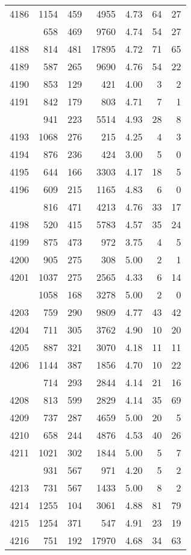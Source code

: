 \documentclass[
]{article}
\begin{document}
\begin{table}
\begin{tabular}[t]{lrrrrrr}
4186 & 1154 & 459 & 4955 & 4.73 & 64 & 27\\
\addlinespace
4187 & 658 & 469 & 9760 & 4.74 & 54 & 27\\
4188 & 814 & 481 & 17895 & 4.72 & 71 & 65\\
4189 & 587 & 265 & 9690 & 4.76 & 54 & 22\\
4190 & 853 & 129 & 421 & 4.00 & 3 & 2\\
4191 & 842 & 179 & 803 & 4.71 & 7 & 1\\
\addlinespace
4192 & 941 & 223 & 5514 & 4.93 & 28 & 8\\
4193 & 1068 & 276 & 215 & 4.25 & 4 & 3\\
4194 & 876 & 236 & 424 & 3.00 & 5 & 0\\
4195 & 644 & 166 & 3303 & 4.17 & 18 & 5\\
4196 & 609 & 215 & 1165 & 4.83 & 6 & 0\\
\addlinespace
4197 & 816 & 471 & 4213 & 4.76 & 33 & 17\\
4198 & 520 & 415 & 5783 & 4.57 & 35 & 24\\
4199 & 875 & 473 & 972 & 3.75 & 4 & 5\\
4200 & 905 & 275 & 308 & 5.00 & 2 & 1\\
4201 & 1037 & 275 & 2565 & 4.33 & 6 & 14\\
\addlinespace
4202 & 1058 & 168 & 3278 & 5.00 & 2 & 0\\
4203 & 759 & 290 & 9809 & 4.77 & 43 & 42\\
4204 & 711 & 305 & 3762 & 4.90 & 10 & 20\\
4205 & 887 & 321 & 3070 & 4.18 & 11 & 11\\
4206 & 1144 & 387 & 1856 & 4.70 & 10 & 22\\
\addlinespace
4207 & 714 & 293 & 2844 & 4.14 & 21 & 16\\
4208 & 813 & 599 & 2829 & 4.14 & 35 & 69\\
4209 & 737 & 287 & 4659 & 5.00 & 20 & 5\\
4210 & 658 & 244 & 4876 & 4.53 & 40 & 26\\
4211 & 1021 & 302 & 1844 & 5.00 & 5 & 7\\
\addlinespace
4212 & 931 & 567 & 971 & 4.20 & 5 & 2\\
4213 & 731 & 567 & 1433 & 5.00 & 8 & 2\\
4214 & 1255 & 104 & 3061 & 4.88 & 81 & 79\\
4215 & 1254 & 371 & 547 & 4.91 & 23 & 19\\
4216 & 751 & 192 & 17970 & 4.68 & 34 & 63\\

\end{tabular}
\end{table}
\end{document}
